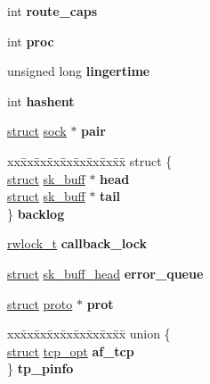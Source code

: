 \begin{DoxyCompactItemize}
int {\bfseries route\+\_\+caps}
\item 
\mbox{\label{structsock_afd478147b60434e21eeea98e73bcdc43}} 
int {\bfseries proc}
\item 
\mbox{\label{structsock_a5ac62db334c6fc4a4b38d998bc5921e4}} 
unsigned long {\bfseries lingertime}
\item 
\mbox{\label{structsock_a6408cef24aebff279dbd63dd679ed36d}} 
int {\bfseries hashent}
\item 
\mbox{\label{structsock_a32ff74bbfe3e80b10ee6adf6e22ea72c}} 
\hyperlink{interfacestruct}{struct} \hyperlink{structsock}{sock} $\ast$ {\bfseries pair}
\item 
\mbox{\label{structsock_a091cca2e79fb676becbdb35cdd12e2be}} 
\begin{tabbing}
xx\=xx\=xx\=xx\=xx\=xx\=xx\=xx\=xx\=\kill
struct \{\\
\>\hyperlink{interfacestruct}{struct} \hyperlink{structsk__buff}{sk\_buff} $\ast$ {\bfseries head}\\
\>\hyperlink{interfacestruct}{struct} \hyperlink{structsk__buff}{sk\_buff} $\ast$ {\bfseries tail}\\
\} {\bfseries backlog}\\

\end{tabbing}\item 
\mbox{\label{structsock_a12ccf8d9adf49eca5920f41b1f36e4c8}} 
\hyperlink{structrwlock__t}{rwlock\+\_\+t} {\bfseries callback\+\_\+lock}
\item 
\mbox{\label{structsock_a2ec96f1f472f26a4ff8243017d3202b8}} 
\hyperlink{interfacestruct}{struct} \hyperlink{structsk__buff__head}{sk\+\_\+buff\+\_\+head} {\bfseries error\+\_\+queue}
\item 
\mbox{\label{structsock_a8b7dcf7f45196c2dad2652c6f3f3e248}} 
\hyperlink{interfacestruct}{struct} \hyperlink{structproto}{proto} $\ast$ {\bfseries prot}
\item 
\mbox{\label{structsock_a3b39cebc33a47b7e49705e19c157f243}} 
\begin{tabbing}
xx\=xx\=xx\=xx\=xx\=xx\=xx\=xx\=xx\=\kill
union \{\\
\>\hyperlink{interfacestruct}{struct} \hyperlink{structtcp__opt}{tcp\_opt} {\bfseries af\_tcp}\\
\} {\bfseries tp\_pinfo}\\


\end{tabbing}
\end{DoxyCompactItemize}
